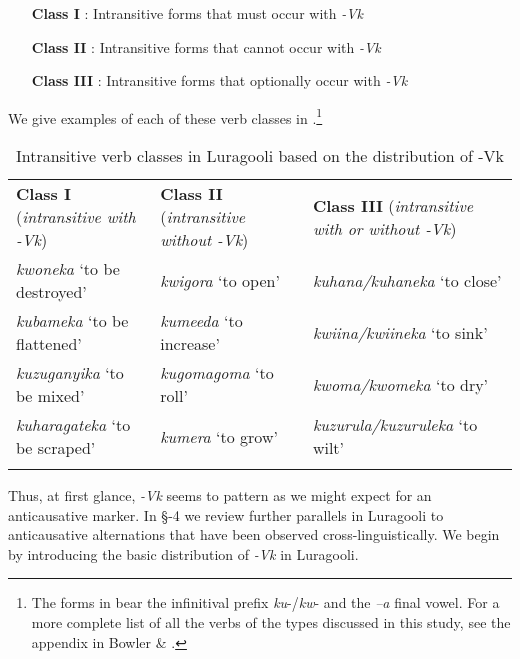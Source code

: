 \documentclass[output=paper]{langsci/langscibook}
\begin{document}
\begin{itemize}
     \item[\textbf{  Class I}]: Intransitive forms that must occur with \textit{-Vk}\\
     \item[\textbf{  Class II}]: Intransitive forms that cannot occur with \textit{-Vk}\\
     \item[\textbf{  Class III}]: Intransitive forms that optionally occur with \textit{-Vk}\\
\end{itemize}

     
We give examples of each of these verb classes in .\footnote{The forms in  bear the infinitival prefix \textit{ku}-/\textit{kw}- and the \textit{–a} final vowel. For a more complete list of all the verbs of the types discussed in this study, see the appendix in Bowler \& \citet{Gluckman2015}.}

\begin{table}
\caption{Intransitive verb classes in Luragooli based on the distribution of -Vk}
\label{tab:1}

\begin{tabularx}{\textwidth}{XXX}
\lsptoprule

\textbf{Class I} (\textit{intransitive with -Vk}) & \textbf{Class II} (\textit{intransitive without -Vk}) & \textbf{Class III} (\textit{intransitive with or without -Vk})\\
\textit{kwoneka} ‘to be destroyed’ & \textit{kwigora} ‘to open’ & \textit{kuhana/kuhaneka} ‘to close’\\
\textit{kubameka} ‘to be flattened’ & \textit{kumeeda} ‘to increase’ & \textit{kwiina/kwiineka} ‘to sink’\\
\textit{kuzuganyika} ‘to be mixed’ & \textit{kugomagoma} ‘to roll’ & \textit{kwoma/kwomeka} ‘to dry’\\
\textit{kuharagateka} ‘to be scraped’ & \textit{kumera} ‘to grow’ & \textit{kuzurula/kuzuruleka} ‘to wilt’\\
\lspbottomrule
\end{tabularx}
\end{table}


Thus, at first glance, \textit{-Vk }seems to pattern as we might expect for an anticausative marker. In §-4 we review further parallels in Luragooli to anticausative alternations that have been observed cross-linguistically. We begin  by introducing the basic distribution of \textit{-Vk} in Luragooli.
\end{document}
